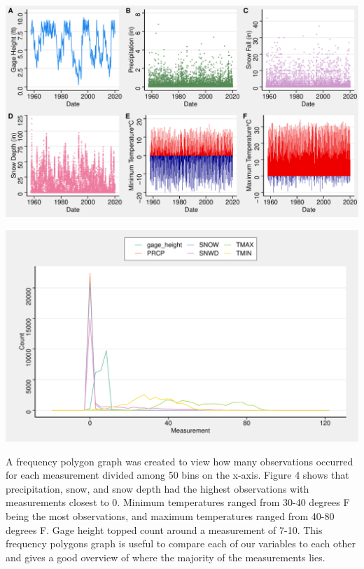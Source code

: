 \documentclass[12pt,]{article}
\let\origfigure\figure
\let\endorigfigure\endfigure
\renewenvironment{figure}[1][2] {
    \expandafter\origfigure\expandafter[H]
} {
    \endorigfigure
}
\begin{document}
\begin{figure}
\centering
\includegraphics{Shintaku_ENV872_Project_files/figure-latex/unnamed-chunk-5-1.pdf}
\caption{Lake Tahoe Gage Height and Climate Data Time Series 1957-2019}
\end{figure}

\begin{figure}
\centering
\includegraphics{Shintaku_ENV872_Project_files/figure-latex/unnamed-chunk-6-1.pdf}
\caption{Frequency Polygons Plot of Gage Height and Climate Data}
\end{figure}

A frequency polygon graph was created to view how many observations
occurred for each measurement divided among 50 bins on the x-axis.
Figure 4 shows that precipitation, snow, and snow depth had the highest
observations with measurements closest to 0. Minimum temperatures ranged
from 30-40 degrees F being the most observations, and maximum
temperatures ranged from 40-80 degrees F. Gage height topped count
around a measurement of 7-10. This frequency polygons graph is useful to
compare each of our variables to each other and gives a good overview of
where the majority of the measurements lies.
\end{document}
